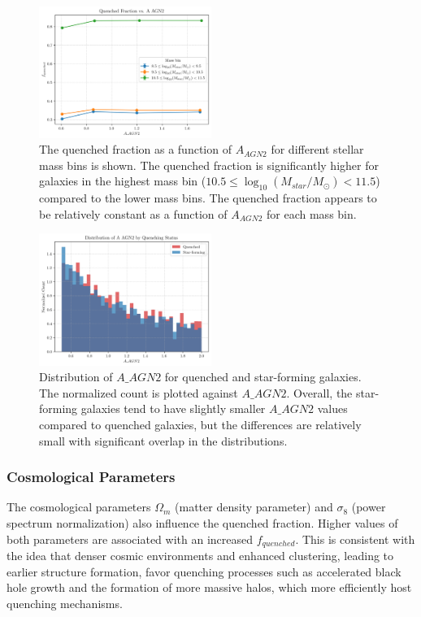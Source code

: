 \documentclass[twocolumn]{aastex631}
\begin{document}
\begin{figure}[h!]
    \centering
    \includegraphics[width=0.5\textwidth]{../Project6/plots/fquenched_vs_A_AGN2_20250424_133935.png}
    \caption{\label{fig:fquenched_AAGN2} The quenched fraction as a function of $A_{AGN2}$ for different stellar mass bins is shown. The quenched fraction is significantly higher for galaxies in the highest mass bin ($10.5 \leq \log_{10}(M_{star}/M_{\odot}) < 11.5$) compared to the lower mass bins. The quenched fraction appears to be relatively constant as a function of $A_{AGN2}$ for each mass bin.
}
\end{figure}

\begin{figure}[h!]
    \centering
    \includegraphics[width=0.5\textwidth]{../Project6/plots/A_AGN2_histogram_6_20250424_133143.png}
    \caption{\label{fig:AAGN2_hist} Distribution of $A\_AGN2$ for quenched and star-forming galaxies. The normalized count is plotted against $A\_AGN2$. Overall, the star-forming galaxies tend to have slightly smaller $A\_AGN2$ values compared to quenched galaxies, but the differences are relatively small with significant overlap in the distributions.
}
\end{figure}

\subsubsection{Cosmological Parameters}

The cosmological parameters \(\Omega_m\) (matter density parameter) and \(\sigma_8\) (power spectrum normalization) also influence the quenched fraction. Higher values of both parameters are associated with an increased \(f_{quenched}\). This is consistent with the idea that denser cosmic environments and enhanced clustering, leading to earlier structure formation, favor quenching processes such as accelerated black hole growth and the formation of more massive halos, which more efficiently host quenching mechanisms.
\end{document}
